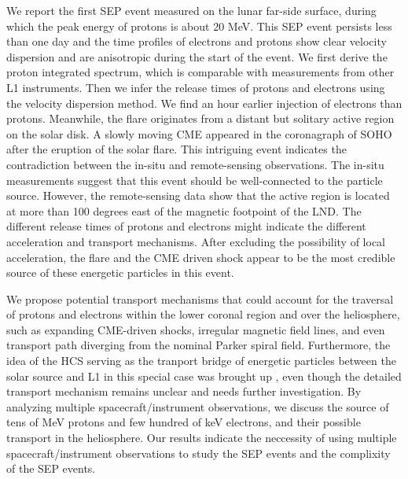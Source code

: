 We report the first \ac{SEP} event measured on the lunar far-side surface, during which the peak energy of protons is about 20 MeV. This \ac{SEP} event persists less than one day and the time profiles of electrons and protons show clear velocity dispersion and are anisotropic during the start of the event.
We first derive the proton integrated spectrum, which is comparable with measurements from other \acs{L1} instruments. Then we infer the release times of protons and electrons using the velocity dispersion method. We find an hour earlier injection of electrons than protons. Meanwhile, the flare originates from a distant but solitary active region on the solar disk. A slowly moving \ac{CME} appeared in the coronagraph of \acs{SOHO} after the eruption of the solar flare.
This intriguing event indicates the contradiction between the in-situ and remote-sensing observations. The in-situ measurements suggest that this event should be well-connected to the particle source. However, the remote-sensing data show that the active region is located at more than 100 degrees east of the magnetic footpoint of the \ac{LND}. The different release times of protons and electrons might indicate the different acceleration and transport mechanisms.
After excluding the possibility of local acceleration, the flare and the \ac{CME} driven shock appear to be the most credible source of these energetic particles in this event. 

We propose potential transport mechanisms that could account for the traversal of protons and electrons within the lower coronal region and over the heliosphere, such as expanding \ac{CME}-driven shocks, irregular magnetic field lines, and even transport path diverging from the nominal Parker spiral field. Furthermore, the idea of the \ac{HCS} serving as the tranport bridge of energetic particles between the solar source and \acs{L1} in this special case was brought up \citep{Battarbee2018ApJ}, even though the detailed transport mechanism remains unclear and needs further investigation. 
By analyzing multiple spacecraft/instrument observations, we discuss the source of tens of MeV protons and few hundred of keV electrons, and their possible transport in the heliosphere. Our results indicate the neccessity of using multiple spacecraft/instrument observations to study the \ac{SEP} events and the complixity of the \ac{SEP} events.


